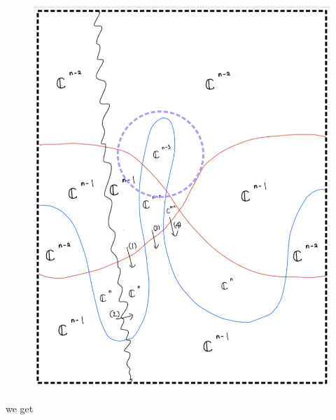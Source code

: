\begin{enumerate}[label=(Step \arabic*)]
\begin{figure}[H]
    \centering
    \includegraphics[scale = 0.95]{diagrams/cobord'8/6.png}
    \caption{}
    \label{fig:your-label}
\end{figure}

we get


\end{enumerate}
